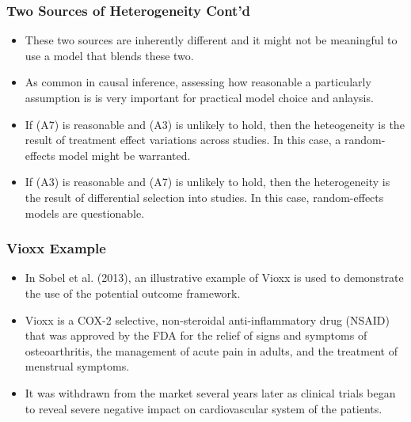 \documentclass[xetex,mathserif,serif]{beamer}
\begin{document}
\begin{frame}
  \frametitle{Two Sources of Heterogeneity Cont'd}
  \begin{itemize}
  \item These two sources are inherently different and it might not be meaningful
    to use a model that blends these two.
  \item As common in causal inference, assessing how reasonable a particularly
    assumption is is very important for practical model choice and anlaysis.
  \item If (A7) is reasonable and (A3) is unlikely to hold, then the
    heteogeneity is the result of treatment effect variations across studies. In this
    case, a random-effects model might be warranted.
  \item If (A3) is reasonable and (A7) is unlikely to hold, then the
    heterogeneity is the result of differential selection into studies. In this
    case, random-effects models are questionable.
  \end{itemize}
\end{frame}
\begin{frame}
  \frametitle{Vioxx Example}
  \begin{itemize}
  \item In Sobel et al. (2013), an illustrative example of Vioxx is used to
    demonstrate the use of the potential outcome framework.
  \item Vioxx is a COX-2 selective, non-steroidal anti-inflammatory drug (NSAID)
    that was approved by the FDA for the relief of signs and symptoms of
    osteoarthritis, the management of acute pain in adults, and the treatment of
    menstrual symptoms.
  \item It was withdrawn from the market several years later as clinical trials
    began to reveal severe negative impact on cardiovascular system of the
    patients.
  \end{itemize}
\end{frame}
\end{document}
